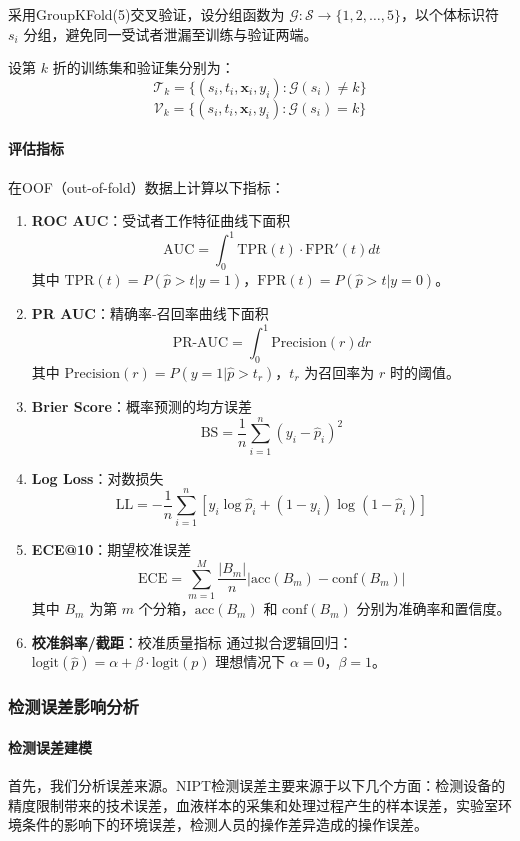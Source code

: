 \documentclass[12pt,a4paper]{ctexart}
\numberwithin{equation}{section}
\theoremstyle{mcm}
\begin{document}
采用GroupKFold(5)交叉验证，设分组函数为 $\mathcal{G}: \mathcal{S} \rightarrow \{1, 2, \ldots, 5\}$，以个体标识符 $s_i$ 分组，避免同一受试者泄漏至训练与验证两端。

设第 $k$ 折的训练集和验证集分别为：
$$\mathcal{T}_k = \{(s_i, t_i, \mathbf{x}_i, y_i) : \mathcal{G}(s_i) \neq k\}$$
$$\mathcal{V}_k = \{(s_i, t_i, \mathbf{x}_i, y_i) : \mathcal{G}(s_i) = k\}$$

\paragraph{评估指标}

在OOF（out-of-fold）数据上计算以下指标：

\begin{enumerate}
\item \textbf{ROC AUC}：受试者工作特征曲线下面积
   $$\text{AUC} = \int_0^1 \text{TPR}(t) \cdot \text{FPR}'(t) dt$$
   其中 $\text{TPR}(t) = P(\hat{p} > t | y = 1)$，$\text{FPR}(t) = P(\hat{p} > t | y = 0)$。

\item \textbf{PR AUC}：精确率-召回率曲线下面积
   $$\text{PR-AUC} = \int_0^1 \text{Precision}(r) dr$$
   其中 $\text{Precision}(r) = P(y = 1 | \hat{p} > t_r)$，$t_r$ 为召回率为 $r$ 时的阈值。

\item \textbf{Brier Score}：概率预测的均方误差
   $$\text{BS} = \frac{1}{n} \sum_{i=1}^n (y_i - \hat{p}_i)^2$$

\item \textbf{Log Loss}：对数损失
   $$\text{LL} = -\frac{1}{n} \sum_{i=1}^n [y_i \log \hat{p}_i + (1-y_i) \log(1-\hat{p}_i)]$$

\item \textbf{ECE@10}：期望校准误差
   $$\text{ECE} = \sum_{m=1}^M \frac{|B_m|}{n} |\text{acc}(B_m) - \text{conf}(B_m)|$$
   其中 $B_m$ 为第 $m$ 个分箱，$\text{acc}(B_m)$ 和 $\text{conf}(B_m)$ 分别为准确率和置信度。

\item \textbf{校准斜率/截距}：校准质量指标
   通过拟合逻辑回归：$\text{logit}(\hat{p}) = \alpha + \beta \cdot \text{logit}(p)$
   理想情况下 $\alpha = 0$，$\beta = 1$。
\end{enumerate}
\subsubsection{检测误差影响分析}
\paragraph{检测误差建模}
首先，我们分析误差来源。NIPT检测误差主要来源于以下几个方面：检测设备的精度限制带来的技术误差，血液样本的采集和处理过程产生的样本误差，实验室环境条件的影响下的环境误差，检测人员的操作差异造成的操作误差。
\end{document}
